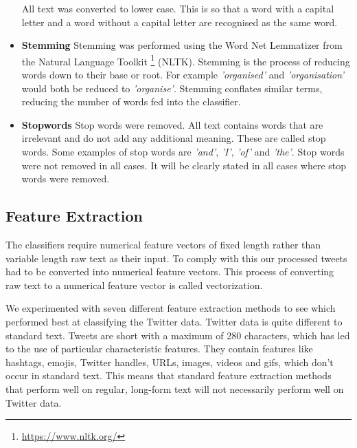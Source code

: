 \begin{itemize}
    All text was converted to lower case. This is so that a word with a capital letter and a word without a capital letter are recognised as the same word.
    \item \textbf{Stemming}\newline
    Stemming was performed using the Word Net Lemmatizer from the Natural Language Toolkit \footnote{\url{https://www.nltk.org/}} (NLTK). Stemming is the process of reducing words down to their base or root. For example \emph{'organised'} and \emph{'organisation'} would both be reduced to \emph{'organise'}. Stemming conflates similar terms, reducing the number of words fed into the classifier.
    \item \textbf{Stopwords}\newline
    Stop words were removed. All text contains words that are irrelevant and do not add any additional meaning. These are called stop words. Some examples of stop words are \emph{'and'}, \emph{'I'}, \emph{'of'} and \emph{'the'}. Stop words were not removed in all cases. It will be clearly stated in all cases where stop words were removed.
\end{itemize}



\subsection{Feature Extraction}

The classifiers require numerical feature vectors of fixed length rather than variable length raw text as their input. To comply with this our processed tweets had to be converted into numerical feature vectors. This process of converting raw text to a numerical feature vector is called vectorization.

We experimented with seven different feature extraction methods to see which performed best at classifying the Twitter data. Twitter data is quite different to standard text. Tweets are short with a maximum of 280 characters, which has led to the use of particular characteristic features. They contain features like hashtags, emojis, Twitter handles, URLs, images, videos and gifs, which don't occur in standard text. This means that standard feature extraction methods that perform well on regular, long-form text will not necessarily perform well on Twitter data.

